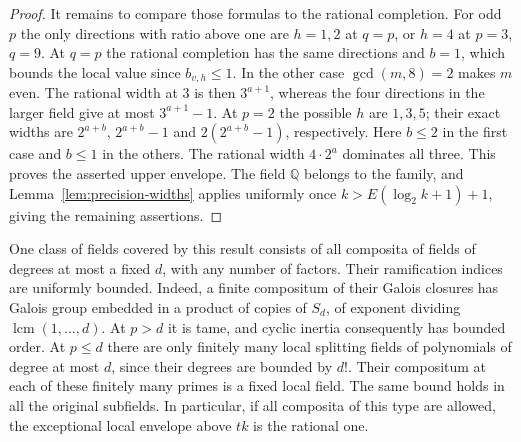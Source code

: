 \documentclass[11pt,letterpaper]{article}
\theoremstyle{definition}
\numberwithin{equation}{section}
\begin{document}
\begin{proof}
It remains to compare those formulas to the rational completion.
For odd $p$ the only directions with ratio above one are $h=1,2$
at $q=p$, or $h=4$ at $p=3$, $q=9$. At $q=p$ the rational
completion has the same directions and $b=1$, which bounds the local
value since $b_{v,h}\le1$. In the other case $\gcd(m,8)=2$ makes
$m$ even. The rational width at $3$ is then $3^{a+1}$, whereas
the four directions in the larger field give at most $3^{a+1}-1$.
At $p=2$ the possible $h$ are $1,3,5$; their exact widths
are $2^{a+b}$, $2^{a+b}-1$ and $2(2^{a+b}-1)$, respectively.
Here $b\le2$ in the first case and $b\le1$ in the others.
The rational width $4\cdot2^a$ dominates all three. This proves
the asserted upper envelope. The field $\mathbb Q$ belongs to the
family, and Lemma~\ref{lem:precision-widths} applies uniformly once
$k>E(\log_2k+1)+1$, giving the remaining assertions.
\end{proof}

One class of fields covered by this result consists of all composita
of fields of degrees at most a fixed $d$, with any number of factors.
Their ramification indices are uniformly bounded. Indeed, a finite
compositum of their Galois closures has Galois group embedded in a
product of copies of $S_d$, of exponent dividing
$\operatorname{lcm}(1,\ldots,d)$. At $p>d$ it is tame, and cyclic
inertia consequently has bounded order. At $p\le d$ there are
only finitely many local splitting fields of polynomials of degree
at most $d$, since their degrees are bounded by $d!$.
Their compositum at each of these finitely many primes is a fixed
local field. The same bound holds in all the original subfields.
In particular, if all composita of this type are allowed, the
exceptional local envelope above $tk$ is the rational one.
\end{document}
